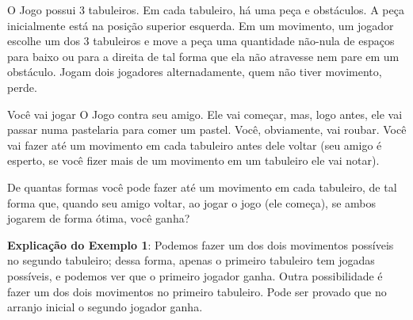 %

O Jogo possui 3 tabuleiros. Em cada tabuleiro, há uma peça e obstáculos. A peça inicialmente está na posição superior esquerda. Em um movimento, um jogador escolhe um dos 3 tabuleiros e move a peça uma quantidade não-nula de espaços para baixo ou para a direita de tal forma que ela não atravesse nem pare em um obstáculo. Jogam dois jogadores alternadamente, quem não tiver movimento, perde.

Você vai jogar O Jogo contra seu amigo. Ele vai começar, mas, logo antes, ele vai passar numa pastelaria para comer um pastel. Você, obviamente, vai roubar. Você vai fazer até um movimento em cada tabuleiro antes dele voltar (seu amigo é esperto, se você fizer mais de um movimento em um tabuleiro ele vai notar).

De quantas formas você pode fazer até um movimento em cada tabuleiro, de tal forma que, quando seu amigo voltar, ao jogar o jogo (ele começa), se ambos jogarem de forma ótima, você ganha?

%
%


%
%


\sampleio

\bigskip
\textbf{Explicação do Exemplo 1}: Podemos fazer um dos dois movimentos possíveis no segundo tabuleiro; dessa forma, apenas o primeiro tabuleiro tem jogadas possíveis, e podemos ver que o primeiro jogador ganha. Outra possibilidade é fazer um dos dois movimentos no primeiro tabuleiro. Pode ser provado que no arranjo inicial o segundo jogador ganha.

